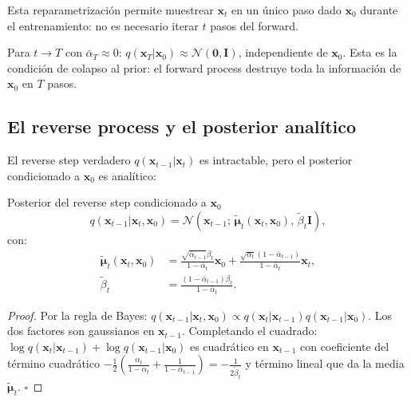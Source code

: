 Esta reparametrización permite muestrear $\bm{x}_t$ en un único paso dado
$\bm{x}_0$ durante el entrenamiento: no es necesario iterar $t$ pasos del
forward.

Para $t\to T$ con $\bar{\alpha}_T\approx 0$: $q(\bm{x}_T|\bm{x}_0)\approx
\mathcal{N}(\bm{0},\bm{I})$, independiente de $\bm{x}_0$. Esta es la condición
de colapso al prior: el forward process destruye toda la información de $\bm{x}_0$
en $T$ pasos.

\subsection{El reverse process y el posterior analítico}
\label{subsec:ddpm_reverse_prior}

El reverse step verdadero $q(\bm{x}_{t-1}|\bm{x}_t)$ es intractable, pero el
posterior condicionado a $\bm{x}_0$ es analítico:

\begin{proposicion}{Posterior del reverse step condicionado a $\bm{x}_0$}
\label{prop:ddpm_posterior}
\begin{equation}
  q(\bm{x}_{t-1}|\bm{x}_t,\bm{x}_0)
  = \mathcal{N}\!\left(\bm{x}_{t-1};\,\tilde{\bm{\mu}}_t(\bm{x}_t,\bm{x}_0),\,
  \tilde{\beta}_t\bm{I}\right),
  \label{eq:ddpm_posterior}
\end{equation}
con:
\begin{align}
  \tilde{\bm{\mu}}_t(\bm{x}_t,\bm{x}_0)
  &= \frac{\sqrt{\bar{\alpha}_{t-1}}\beta_t}{1-\bar{\alpha}_t}\bm{x}_0
  + \frac{\sqrt{\alpha_t}(1-\bar{\alpha}_{t-1})}{1-\bar{\alpha}_t}\bm{x}_t,
  \label{eq:ddpm_posterior_mean}\\
  \tilde{\beta}_t
  &= \frac{(1-\bar{\alpha}_{t-1})\beta_t}{1-\bar{\alpha}_t}.
  \label{eq:ddpm_posterior_var}
\end{align}
\end{proposicion}

\begin{proof}
Por la regla de Bayes: $q(\bm{x}_{t-1}|\bm{x}_t,\bm{x}_0) \propto
q(\bm{x}_t|\bm{x}_{t-1})q(\bm{x}_{t-1}|\bm{x}_0)$.
Los dos factores son gaussianos en $\bm{x}_{t-1}$. Completando el cuadrado:
$\log q(\bm{x}_t|\bm{x}_{t-1}) + \log q(\bm{x}_{t-1}|\bm{x}_0)$ es
cuadrático en $\bm{x}_{t-1}$ con coeficiente del término cuadrático
$-\frac{1}{2}\left(\frac{\alpha_t}{1-\alpha_t} + \frac{1}{1-\bar{\alpha}_{t-1}}\right)
= -\frac{1}{2\tilde{\beta}_t}$
y término lineal que da la media $\tilde{\bm{\mu}}_t$. $\square$
\end{proof}

